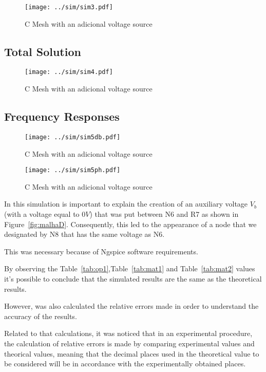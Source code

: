\begin{figure}[H] \centering
\texttt{[image: ../sim/sim3.pdf]}
\caption{C Mesh with an adicional voltage source} %
\label{fig:sim3}
\end{figure}

\subsection{Total Solution}

\begin{figure}[H] \centering
\texttt{[image: ../sim/sim4.pdf]}
\caption{C Mesh with an adicional voltage source} %
\label{fig:sim4}
\end{figure}

\subsection{Frequency Responses}

\begin{figure}[H] \centering
\texttt{[image: ../sim/sim5db.pdf]}
\caption{C Mesh with an adicional voltage source} %
\label{fig:sim5db}
\end{figure}

\begin{figure}[H] \centering
\texttt{[image: ../sim/sim5ph.pdf]}
\caption{C Mesh with an adicional voltage source} %
\label{fig:sim5ph}
\end{figure}

In this simulation is important to explain the creation of an auxiliary voltage $V_b$ (with a voltage equal to $0V$) that was put between N6 and R7 as shown in Figure~\ref{fig:malhaD}. Consequently, this led to the appearance of a node that we designated by N8 that has the same voltage as N6.

This was necessary because of Ngspice software requirements.

By observing the Table~\ref{tab:op1},Table~\ref{tab:mat1} and Table~\ref{tab:mat2} values it's possible to conclude that the simulated results are the same as the theoretical results.%


However, was also calculated the relative errors made in order to understand the accuracy of the results. 

Related to that calculations, it was noticed that in an experimental procedure, the calculation of relative errors is made by comparing experimental values and theorical values, meaning that the decimal places used in the theoretical value to be considered will be in accordance with the experimentally obtained places.


